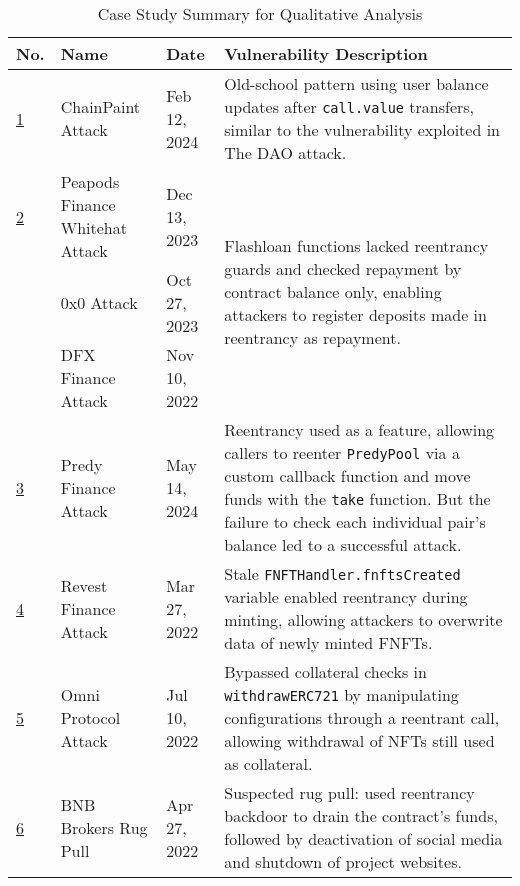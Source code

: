 \bgroup
\def\arraystretch{1.4}
\begin{table*}[htbp]
    \centering
    \caption{Case Study Summary for Qualitative Analysis}
    \vspace{-1mm}
    
\begin{footnotesize}
    \begin{tabular}{|p{0.3cm}|p{3.9cm}|p{1.6cm}|p{10.5cm}|}
        \hline
        \textbf{No.} & \textbf{Name} & \textbf{Date} & \textbf{Vulnerability Description} \\
        \hline
        \hyperref[case-study:1]{1} & ChainPaint Attack & Feb 12, 2024 & Old-school pattern using user balance updates after \lstinline$call.value$ transfers, similar to the vulnerability exploited in The DAO attack. \\
        \hline
        \hyperref[case-study:2]{2} & Peapods Finance Whitehat Attack & Dec 13, 2023 & \multirow{3}{10cm}{Flashloan functions lacked reentrancy guards and checked repayment by contract balance only, enabling attackers to register deposits made in reentrancy as repayment.} \\
        \cline{2-3}
         & 0x0 Attack & Oct 27, 2023 & \\
        \cline{2-3}
         & DFX Finance Attack & Nov 10, 2022 & \\
        \hline
        \hyperref[case-study:3]{3} & Predy Finance Attack & May 14, 2024 & Reentrancy used as a feature, allowing callers to reenter \lstinline$PredyPool$ via a custom callback function and move funds with the \lstinline$take$ function. But the failure to check each individual pair's balance led to a successful attack. \\
        \hline
        \hyperref[case-study:4]{4} & Revest Finance Attack & Mar 27, 2022 & Stale \lstinline$FNFTHandler.fnftsCreated$ variable enabled reentrancy during minting, allowing attackers to overwrite data of newly minted FNFTs. \\ 
        \hline
        \hyperref[case-study:5]{5} & Omni Protocol Attack & Jul 10, 2022 & Bypassed collateral checks in \lstinline$withdrawERC721$ by manipulating configurations through a reentrant call, allowing withdrawal of NFTs still used as collateral. \\
        \hline
        \hyperref[case-study:6]{6} & BNB Brokers Rug Pull & Apr 27, 2022 & \multirow{2}{10cm}{Suspected rug pull: used reentrancy backdoor to drain the contract's funds, followed by deactivation of social media and shutdown of project websites.} \\

\end{tabular}
\end{footnotesize}
\end{table*}
